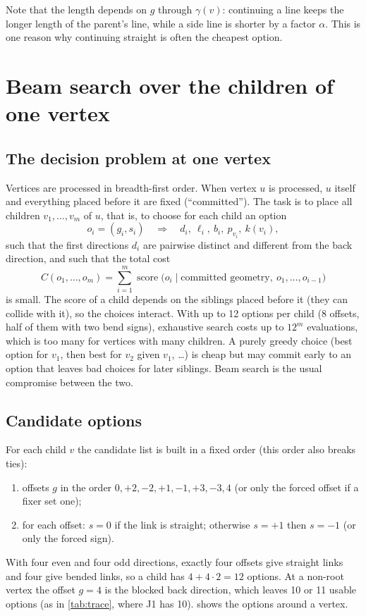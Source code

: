 \documentclass[11pt,a4paper]{article}
\newcommand{\len}{\ell}
\newcommand{\Score}{\operatorname{score}}
\begin{document}
Note that the length depends on $g$ through $\gamma(v)$: continuing a line keeps the longer length of the parent's line, while a side line is shorter by a factor $\alpha$. This is one reason why continuing straight is often the cheapest option.

\section{Beam search over the children of one vertex}
\label{sec:beam}

\subsection{The decision problem at one vertex}

Vertices are processed in breadth-first order. When vertex $u$ is processed, $u$ itself and everything placed before it are fixed (``committed''). The task is to place all children $v_1,\dots,v_m$ of $u$, that is, to choose for each child an option
\[
  o_i = (g_i, s_i) \quad\Longrightarrow\quad d_i,\ \len_i,\ b_i,\ p_{v_i},\ k(v_i),
\]
such that the first directions $d_i$ are pairwise distinct and different from the back direction, and such that the total cost
\[
  \textstyle C(o_1,\dots,o_m) = \sum_{i=1}^{m} \Score\bigl(o_i \mid \text{committed geometry},\ o_1,\dots,o_{i-1}\bigr)
\]
is small. The score of a child depends on the siblings placed before it (they can collide with it), so the choices interact. With up to 12 options per child (8 offsets, half of them with two bend signs), exhaustive search costs up to $12^m$ evaluations, which is too many for vertices with many children. A purely greedy choice (best option for $v_1$, then best for $v_2$ given $v_1$, \dots) is cheap but may commit early to an option that leaves bad choices for later siblings. Beam search is the usual compromise between the two.

\subsection{Candidate options}

For each child $v$ the candidate list is built in a fixed order (this order also breaks ties):
\begin{enumerate}
  \item offsets $g$ in the order $0, +2, -2, +1, -1, +3, -3, 4$ (or only the forced offset if a fixer set one);
  \item for each offset: $s=0$ if the link is straight; otherwise $s=+1$ then $s=-1$ (or only the forced sign).
\end{enumerate}
With four even and four odd directions, exactly four offsets give straight links and four give bended links, so a child has $4+4\cdot2=12$ options. At a non-root vertex the offset $g=4$ is the blocked back direction, which leaves 10 or 11 usable options (as in \cref{tab:trace}, where J1 has 10).  shows the options around a vertex.
\end{document}

